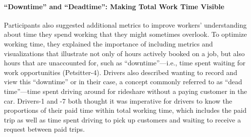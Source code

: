 \paragraph{\textbf{``Downtime'' and ``Deadtime'': {Making} Total Work Time {Visible}}}
{Participants also suggested additional metrics to improve workers' understanding about time they spend working that they might sometimes overlook.}
To optimize working time, they explained the importance of including metrics and visualizations that illustrate not only of hours {actively booked on a job}, but also hours that are unaccounted for, such as ``downtime''---i.e., time spent waiting for work opportunities (Petsitter-4). 
Drivers {also described wanting to record and view this ``downtime'' or in their case, a concept commonly referred to as ``dead time''}---time spent driving around {for rideshare} without a paying customer in the car.
Drivers-1 and -7 both thought it was imperative for drivers to know the proportions of their paid time within total working time, which includes the paid trip as well as time spent driving to pick up customers and waiting to receive a request between paid trips.








